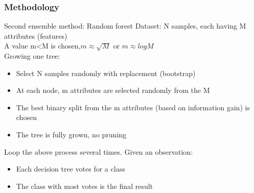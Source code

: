 \documentclass[xcolor={x11names,svgnames,dvipsnames}]{beamer}
\begin{document}
\begin{frame}
	\frametitle{Methodology}
		\begin{block}{Second ensemble method: Random forest}	
			Dataset: N samples, each having M attributes (features)\\
			A value m<M is chosen,$m \approx \sqrt{M} $ or $m \approx log{M}$\\
		Growing one tree:
		
		\begin{itemize}
		\item Select N samples randomly with replacement (bootstrap)\\
		\item At each node, m attributes are selected randomly from the M
		\item The best binary split from the m attributes (based on
		information gain) is chosen\\
		\item The tree is fully grown, no pruning		
		
		\end{itemize}
		Loop the above process several times. Given an observation:\\
		\begin{itemize}
		\item Each decision tree votes for a class\\
		\item The class with most votes is the final result\\		
		\end{itemize}	 
		\end{block}	
\end{frame}
\end{document}
